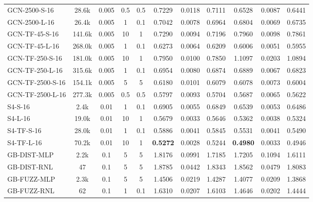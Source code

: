 \begin{table*}[h]
{\begin{tabular}{l c c cc >{\columncolor{gray!20}}ccc >{\columncolor{gray!20}}ccc}
            GCN-2500-S-16 & 28.6k & 0.005 & 0.5 & 0.5 & 0.7229 & 0.0118 & 0.7111 & 0.6528 & 0.0087 & 0.6441 \\
            GCN-2500-L-16 & 26.4k & 0.005 & 1 & 0.1 & 0.7042 & 0.0078 & 0.6964 & 0.6804 & 0.0069 & 0.6735 \\
            \hline
            GCN-TF-45-S-16 & 141.6k & 0.005 & 10 & 1 & 0.7290 & 0.0094 & 0.7196 & 0.7960 & 0.0098 & 0.7861 \\
            GCN-TF-45-L-16 & 268.0k & 0.005 & 1 & 0.1 & 0.6273 & 0.0064 & 0.6209 & 0.6006 & 0.0051 & 0.5955 \\
            GCN-TF-250-S-16 & 181.0k & 0.005 & 10 & 1 & 0.7950 & 0.0100 & 0.7850 & 1.1097 & 0.0203 & 1.0894 \\
            GCN-TF-250-L-16 & 315.6k & 0.005 & 1 & 0.1 & 0.6954 & 0.0080 & 0.6874 & 0.6889 & 0.0067 & 0.6823 \\
            GCN-TF-2500-S-16 & 154.1k & 0.005 & 5 & 5 & 0.6180 & 0.0101 & 0.6079 & 0.6078 & 0.0073 & 0.6004 \\
            GCN-TF-2500-L-16 & 277.3k & 0.005 & 0.5 & 0.5 & 0.5797 & 0.0093 & 0.5704 & 0.5687 & 0.0065 & 0.5622 \\
            \hline
            S4-S-16 & 2.4k & 0.01 & 1 & 0.1 & 0.6905 & 0.0055 & 0.6849 & 0.6539 & 0.0053 & 0.6486 \\
            S4-L-16 & 19.0k & 0.01 & 10 & 1 & 0.5679 & 0.0033 & 0.5646 & 0.5362 & 0.0038 & 0.5324 \\
            \hline
            S4-TF-S-16 & 28.0k & 0.01 & 1 & 0.1 & 0.5886 & 0.0041 & 0.5845 & 0.5531 & 0.0041 & 0.5490 \\
            S4-TF-L-16 & 70.2k & 0.01 & 10 & 1 & \textbf{0.5272} & 0.0028 & 0.5244 & \textbf{0.4980} & 0.0033 & 0.4946 \\
            \hline
            GB-DIST-MLP & 2.2k & 0.1 & 5 & 5 & 1.8176 & 0.0991 & 1.7185 & 1.7205 & 0.1094 & 1.6111 \\
            GB-DIST-RNL & 47 & 0.1 & 5 & 5 & 1.8785 & 0.0442 & 1.8343 & 1.8562 & 0.0479 & 1.8083 \\
            \hline
            GB-FUZZ-MLP & 2.3k & 0.1 & 5 & 5 & 1.4506 & 0.0219 & 1.4287 & 1.4077 & 0.0209 & 1.3868 \\
            GB-FUZZ-RNL & 62 & 0.1 & 1 & 0.1 & 1.6310 & 0.0207 & 1.6103 & 1.4646 & 0.0202 & 1.4444 \\
            \hline
            \hline
        \end{tabular}
    }
\end{table*}

